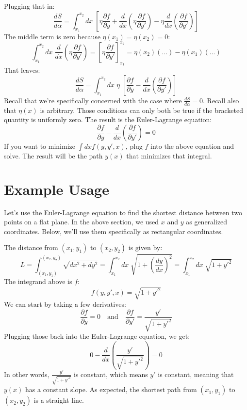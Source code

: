 \documentclass[10pt]{article}
\begin{document}
Plugging that in:
$$
\frac{dS}{d\alpha} = \displaystyle\int_{x_1}^{x_2} dx \; \left[
    \eta \frac{\partial f}{\partial y} +
    \frac{d}{d x} \left( \eta \frac{\partial f}{\partial y'} \right) -
    \eta \frac{d}{dx} \left( \frac{\partial f}{\partial y'} \right) 
\right]
$$
The middle term is zero because $\eta(x_1) = \eta(x_2) = 0$:
$$
\displaystyle\int_{x_1}^{x_2} dx \; \frac{d}{d x} \left( \eta \frac{\partial f}{\partial y'} \right) = 
\left[ \eta \frac{\partial f}{\partial y'} \right]_{x_1}^{x_2} = 
\eta(x_2) \left( ... \right) - \eta(x_1) \left( ... \right)
$$
That leaves:
$$
\frac{dS}{d\alpha} = \displaystyle\int_{x_1}^{x_2} dx \; \eta \; \left[
    \frac{\partial f}{\partial y} -
    \frac{d}{dx} \left( \frac{\partial f}{\partial y'} \right) 
\right]
$$
Recall that we're specifically concerned with the case where $\frac{dS}{d\alpha}=0$. Recall also that $\eta(x)$ is arbitrary. Those conditions can only both be true if the bracketed quantity is uniformly zero. The result is the Euler-Lagrange equation:
$$
\frac{\partial f}{\partial y} -
\frac{d}{dx} \left( \frac{\partial f}{\partial y'} \right)
= 0
$$
If you want to minimize $\int dx f(y, y', x)$, plug $f$ into the above equation and solve. The result will be the path $y(x)$ that minimizes that integral.

\section*{Example Usage}

Let's use the Euler-Lagrange equation to find the shortest distance between two points on a flat plane. In the above section, we used $x$ and $y$ as generalized coordinates. Below, we'll use them specifically as rectangular coordinates. 

The distance from $\left( x_1, y_1 \right)$ to $\left( x_2, y_2 \right)$ is given by:
$$
L = \displaystyle\int_{(x_1, y_1)}^{(x_2, y_2)} \sqrt{dx^2 + dy^2} =
\displaystyle\int_{x_1}^{x_2} dx \; \sqrt{1 + \left(\frac{dy}{dx} \right)^2} = 
\displaystyle\int_{x_1}^{x_2} dx \; \sqrt{1 + y'^2}
$$
The integrand above is $f$:
$$
f(y, y', x) = \sqrt{1 + y'^2}
$$
We can start by taking a few derivatives:
$$
\frac{\partial f}{\partial y} = 0
\quad \mathrm{and} \quad
\frac{\partial f}{\partial y'} = \frac{y'}{ \sqrt{1 + y'^2} }
$$
Plugging those back into the Euler-Lagrange equation, we get:
$$
0 - \frac{d}{dx} \left( \frac{y'}{ \sqrt{1 + y'^2} } \right) = 0
$$
In other words, $\frac{y'}{ \sqrt{1 + y'^2} }$ is constant, which means $y'$ is constant, meaning that $y(x)$ has a constant slope. As expected, the shortest path from $\left( x_1, y_1 \right)$ to $\left( x_2, y_2 \right)$ is a straight line.
\end{document}
